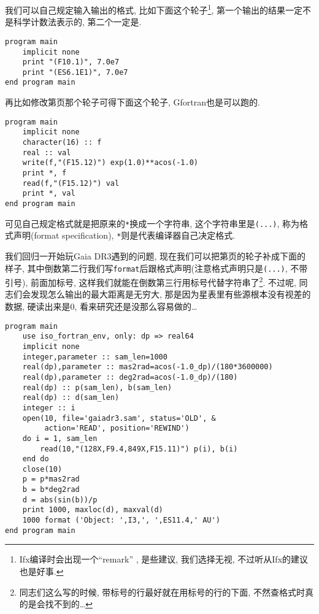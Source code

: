 我们可以自己规定输入输出的格式, 比如下面这个轮子\footnote{Ifx编译时会出现一个``remark'' , 是些建议, 我们选择无视, 不过听从Ifx的建议也是好事.}, 第一个输出的结果一定不是科学计数法表示的, 第二个一定是. 
\begin{lstlisting}
program main
    implicit none
    print "(F10.1)", 7.0e7
    print "(ES6.1E1)", 7.0e7
end program main
\end{lstlisting}
再比如修改第\pageref{internal_file}页那个轮子可得下面这个轮子, Gfortran也是可以跑的.
\begin{lstlisting}
program main
    implicit none
    character(16) :: f
    real :: val
    write(f,"(F15.12)") exp(1.0)**acos(-1.0)
    print *, f
    read(f,"(F15.12)") val
    print *, val
end program main
\end{lstlisting}
可见自己规定格式就是把原来的\texttt{*}换成一个字符串, 这个字符串里是\texttt{(...)}, 称为格式声明(format specification), \texttt{*}则是代表编译器自己决定格式.

我们回归一开始玩Gaia DR3遇到的问题, 现在我们可以把第\pageref{gaiadr3.sam}页的轮子补成下面的样子, 其中倒数第二行我们写\texttt{format}后跟格式声明(注意格式声明只是\texttt{(...)}, 不带引号), 前面加标号, 这样我们就能在倒数第三行用标号代替字符串了\footnote{同志们这么写的时候, 带标号的行最好就在用标号的行的下面, 不然查格式时真的是会找不到的\dots}. 不过呢, 同志们会发现怎么输出的最大距离是无穷大, 那是因为星表里有些源根本没有视差的数据, 硬读出来是$0$, 看来研究还是没那么容易做的\dots
\begin{lstlisting}
program main
    use iso_fortran_env, only: dp => real64
    implicit none
    integer,parameter :: sam_len=1000
    real(dp),parameter :: mas2rad=acos(-1.0_dp)/(180*3600000)
    real(dp),parameter :: deg2rad=acos(-1.0_dp)/(180)
    real(dp) :: p(sam_len), b(sam_len)
    real(dp) :: d(sam_len)
    integer :: i
    open(10, file='gaiadr3.sam', status='OLD', &
         action='READ', position='REWIND')
    do i = 1, sam_len
        read(10,"(128X,F9.4,849X,F15.11)") p(i), b(i)
    end do
    close(10)
    p = p*mas2rad
    b = b*deg2rad
    d = abs(sin(b))/p
    print 1000, maxloc(d), maxval(d)
    1000 format ('Object: ',I3,', ',ES11.4,' AU')
end program main
\end{lstlisting}

